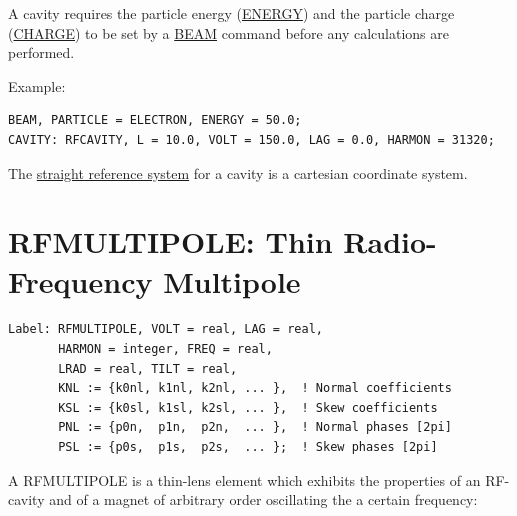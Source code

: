 A cavity requires the particle energy (\href{beam.html#energy}{ENERGY})
and the particle charge (\href{beam.html#charge}{CHARGE}) to be set by a
\href{beam.html}{BEAM} command before any calculations are performed.  

 Example: 
\begin{verbatim}
BEAM, PARTICLE = ELECTRON, ENERGY = 50.0;
CAVITY: RFCAVITY, L = 10.0, VOLT = 150.0, LAG = 0.0, HARMON = 31320;
\end{verbatim} 

The \href{local_system.html#straight}{straight reference system} for a
cavity is a cartesian coordinate system.  


%
\section{RFMULTIPOLE: Thin Radio-Frequency Multipole}
\begin{verbatim}
Label: RFMULTIPOLE, VOLT = real, LAG = real,
       HARMON = integer, FREQ = real,
       LRAD = real, TILT = real,
       KNL := {k0nl, k1nl, k2nl, ... },  ! Normal coefficients
       KSL := {k0sl, k1sl, k2sl, ... },  ! Skew coefficients
       PNL := {p0n,  p1n,  p2n,  ... },  ! Normal phases [2pi]
       PSL := {p0s,  p1s,  p2s,  ... };  ! Skew phases [2pi]
\end{verbatim} 

A RFMULTIPOLE is a thin-lens element which exhibits the properties
of an RF-cavity and of a magnet of arbitrary order oscillating the
a certain frequency:        
 
